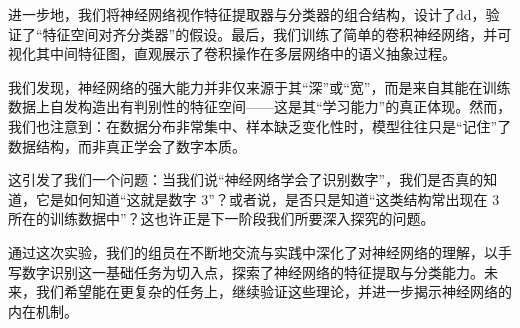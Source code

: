 \documentclass[12pt,a4paper]{article}
\begin{document}
进一步地，我们将神经网络视作特征提取器与分类器的组合结构，设计了dd，验证了“特征空间对齐分类器”的假设。最后，我们训练了简单的卷积神经网络，并可视化其中间特征图，直观展示了卷积操作在多层网络中的语义抽象过程。

我们发现，神经网络的强大能力并非仅来源于其“深”或“宽”，而是来自其能在训练数据上自发构造出有判别性的特征空间——这是其“学习能力”的真正体现。然而，我们也注意到：在数据分布非常集中、样本缺乏变化性时，模型往往只是“记住”了数据结构，而非真正学会了数字本质。

这引发了我们一个问题：当我们说“神经网络学会了识别数字”，我们是否真的知道，它是如何知道“这就是数字 3”？或者说，是否只是知道“这类结构常出现在 3 所在的训练数据中”？这也许正是下一阶段我们所要深入探究的问题。

通过这次实验，我们的组员在不断地交流与实践中深化了对神经网络的理解，以手写数字识别这一基础任务为切入点，探索了神经网络的特征提取与分类能力。未来，我们希望能在更复杂的任务上，继续验证这些理论，并进一步揭示神经网络的内在机制。

\newpage






\end{document}
